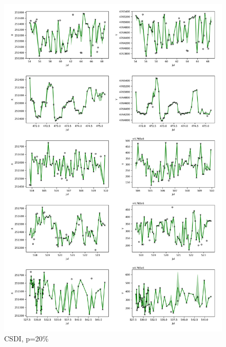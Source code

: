 \documentclass[11pt]{article}
\begin{document}
\begin{figure}[h]
  \centering
  \includegraphics[width=\textwidth]{../figure/20_5094_csdi} %
  \caption{CSDI, p=20\%}
  \label{fig: csdi_20} %
\end{figure}
\end{document}
